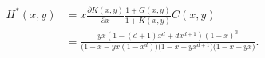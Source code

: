 \documentclass{article}
\begin{document}
\begin{equation*}
\begin{split}
H^*(x,y) &= x \frac{\partial K(x,y)}{\partial x}
\frac{1+G(x,y)}{1+K(x,y)}C(x,y) \\
&= \frac{yx(1-(d+1)x^d+dx^{d+1})(1-x)^3}
{\big(1-x-yx(1-x^d)\big)\big(1-x-yx^{d+1}\big)\big(1-x-yx\big)}.
\end{split}
\end{equation*}



%
%
%
%
%
%
%
%
\end{document}
